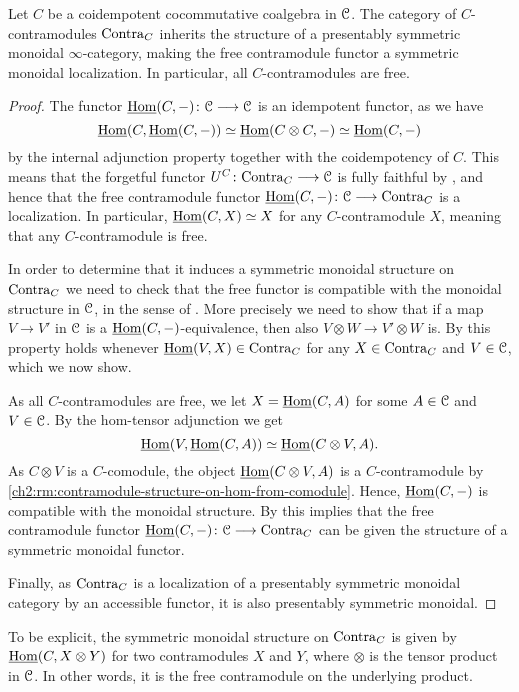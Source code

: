 \begin{lemma}
    \label{ch2:lm:free-contra-monoidal}
    Let $C$ be a coidempotent cocommutative coalgebra in $\EuScript{C}$. The category of $C$-contramodules $\mathrm{Contra}_C$ inherits the structure of a presentably symmetric monoidal $\infty$-category, making the free contramodule functor a symmetric monoidal localization. In particular, all $C$-contramodules are free. 
\end{lemma}
\begin{proof}
    The functor $\operatorname{\underline{Hom}}(C,-)\colon \EuScript{C} \longrightarrow \EuScript{C}$ is an idempotent functor, as we have
    \[\operatorname{\underline{Hom}}(C, \operatorname{\underline{Hom}}(C,-))\simeq \operatorname{\underline{Hom}}(C\otimes C, -)\simeq \operatorname{\underline{Hom}}(C,-)\]
    by the internal adjunction property together with the coidempotency of $C$. This means that the forgetful functor $U^C\colon \mathrm{Contra}_C\longrightarrow \EuScript{C}$ is fully faithful by \cite[5.2.7.4]{lurie_09}, and hence that the free contramodule functor $\operatorname{\underline{Hom}}(C,-)\colon\EuScript{C}\longrightarrow \mathrm{Contra}_C$ is a localization. In particular, $\operatorname{\underline{Hom}}(C, X) \simeq X$ for any $C$-contramodule $X$, meaning that any $C$-contramodule is free. 
    
    In order to determine that it induces a symmetric monoidal structure on $\mathrm{Contra}_C$ we need to check that the free functor is compatible with the monoidal structure in $\EuScript{C}$, in the sense of \cite[2.2.1.7]{Lurie_HA}. More precisely we need to show that if a map $V \to V'$ in $\EuScript{C}$ is a $\operatorname{\underline{Hom}}(C,-)$-equivalence, then also $V\otimes W \to V' \otimes W$ is. By \cite[2.12(3)]{nikolaus_2016} this property holds whenever $\operatorname{\underline{Hom}}(V,X)\in \mathrm{Contra}_C$ for any $X\in \mathrm{Contra}_C$ and $V\in \EuScript{C}$, which we now show. 
    
    As all $C$-contramodules are free, we let $X = \operatorname{\underline{Hom}}(C, A)$ for some $A\in \EuScript{C}$ and $V\in \EuScript{C}$. By the hom-tensor adjunction we get 
    \[\operatorname{\underline{Hom}}(V, \operatorname{\underline{Hom}}(C, A))\simeq \operatorname{\underline{Hom}}(C\otimes V, A).\]
    As $C\otimes V$ is a $C$-comodule, the object $\operatorname{\underline{Hom}}(C\otimes V, A)$ is a $C$-contramodule by \cref{ch2:rm:contramodule-structure-on-hom-from-comodule}. Hence, $\operatorname{\underline{Hom}}(C,-)$ is compatible with the monoidal structure. By \cite[2.2.1.9]{lurie_09} this implies that the free contramodule functor $\operatorname{\underline{Hom}}(C,-)\colon \EuScript{C}\longrightarrow \mathrm{Contra}_C$ can be given the structure of a symmetric monoidal functor. 
    
    Finally, as $\mathrm{Contra}_C$ is a localization of a presentably symmetric monoidal category by an accessible functor, it is also presentably symmetric monoidal.  
\end{proof}

\begin{remark}
    To be explicit, the symmetric monoidal structure on $\mathrm{Contra}_C$ is given by $\operatorname{\underline{Hom}}(C, X\otimes Y)$ for two contramodules $X$ and $Y$, where $\otimes$ is the tensor product in $\EuScript{C}$. In other words, it is the free contramodule on the underlying product. 
\end{remark}

